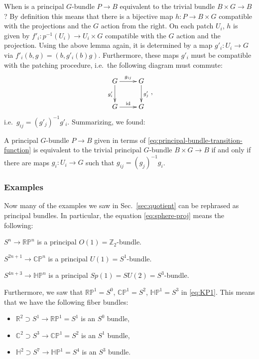 \documentclass[12pt]{article}
\numberwithin{equation}{section}
\def\bC{\mathbb{C}}
\def\bH{\mathbb{H}}
\def\bR{\mathbb{R}}
\def\bZ{\mathbb{Z}}
\def\RP{\mathbb{RP}}
\def\CP{\mathbb{CP}}
\def\HP{\mathbb{HP}}
\begin{document}
When is a principal $G$-bundle $P\to B$ equivalent to the trivial bundle $B\times G \to B$?
By definition this means that there is a bijective map $h: P\to B\times G$
compatible with the projections and the $G$ action from the right.
On each patch $U_i$, $h$ is given by $f'_i: p^{-1}(U_i)\to U_i\times G$
compatible with the $G$ action and the projection.
Using the above lemma again,
it is determined by a map $g'_i: U_i\to G$ via $f'_i(b,g)=(b,g'_i(b)g)$.
Furthermore, these maps $g'_i$ must be compatible with the patching procedure, i.e.~the following diagram must commute:
\begin{equation}
\vcenter{\xymatrix{
  G \ar[r]^{g_{ij}} \ar[d]_{g'_i} & G \ar[d]^{g'_j} \\
  G \ar[r]^{\text{id}} & G 
}},
\end{equation}
i.e.~$g_{ij} = (g'_j)^{-1} g'_i$.
Summarizing, we found: 
\begin{proposition}
  A principal $G$-bundle $P\to B$
  given in terms of \eqref{eq:principal-bundle-transition-function}
  is equivalent to the trivial principal $G$-bundle $B\times G \to B$
  if and only if there are maps $g_i: U_i\to G$ such that $g_{ij} = (g_j)^{-1} g_i$.
\end{proposition}

\subsubsection{Examples}

Now many of the examples we saw in Sec.~\ref{sec:quotient} can be rephrased as principal bundles.
In particular, the equation \eqref{eq:sphere-proj} means the following:
\begin{example}
  \label{ex:RPn}
$S^n\to \RP^n$ is a principal $O(1)=\bZ_2$-bundle.
\end{example}

\begin{example}
  \label{ex:CPn}
$S^{2n+1}\to \CP^n$ is a principal $U(1)=S^1$-bundle.
\end{example}

\begin{example}
  \label{ex:HPn}
  $S^{4n+3}\to \HP^n$ is a principal $Sp(1)=SU(2)=S^3$-bundle.
\end{example}

Furthermore, we saw that $\RP^1=S^0$, $\CP^1=S^2$, $\HP^1=S^3$ 
in \eqref{eq:KP1}. 
This means that we have the following fiber bundles:
\begin{itemize}
  \item $\bR^2\supset S^1\to \RP^1=S^1$  is an $S^0$ bundle,
  \item $\bC^2\supset S^3\to \CP^1=S^2$ is an $S^1$ bundle,
  \item $\bH^2\supset S^7\to \HP^1=S^4$ is an $S^3$ bundle.
\end{itemize}
\end{document}
